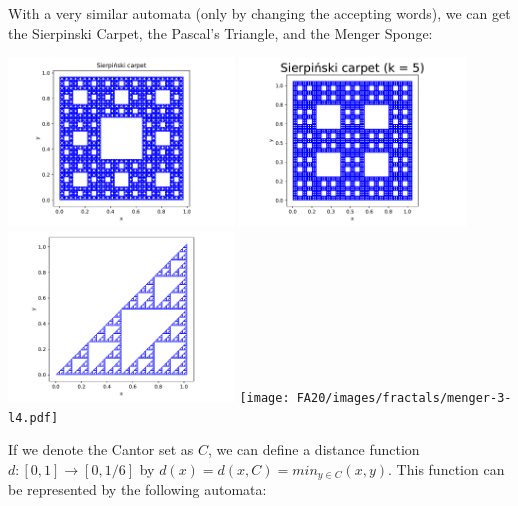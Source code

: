 \documentclass[10pt,usenames,dvipsnames]{article}
\begin{document}
With a very similar automata (only by changing the accepting words), we can get the Sierpinski Carpet, the Pascal's Triangle, and the Menger Sponge:

\begin{center}
    \includegraphics[width=6cm]{FA20/images/fractals/sierpinski-3-l5.pdf}
    \includegraphics[width=6cm]{FA20/images/fractals/sierpinski-5-l3.pdf}\\
    \includegraphics[width=6cm]{FA20/images/fractals/pascal2.pdf}
    \texttt{[image: FA20/images/fractals/menger-3-l4.pdf]}
\end{center}

If we denote the Cantor set as $C$, we can define a distance function $d:[0,1]\rightarrow [0,1/6]$ by $d(x) = d(x,C) = min_{y \in C}(x,y)$. This function can be represented by the following automata: 
\end{document}
